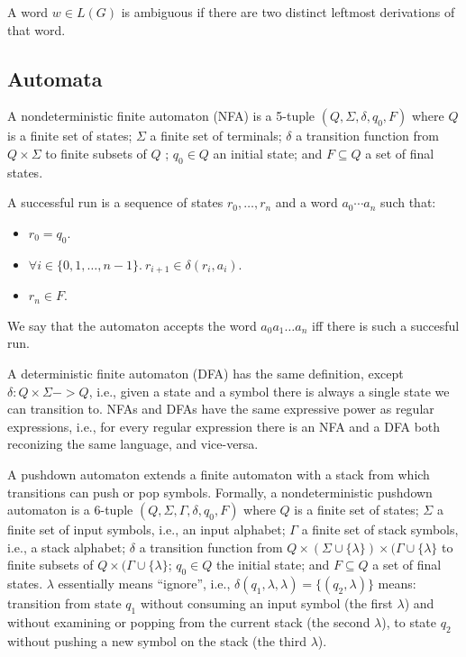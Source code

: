 \documentclass[acmsmall,review,anonymous]{acmart}\settopmatter{printfolios=true,printccs=false,printacmref=false}
\newcommand{\T}{\Sigma} %
\begin{document}
\begin{definition}
A word $w \in L(G)$ is ambiguous if there are two distinct leftmost derivations of that word.
\end{definition}

\subsection{Automata} \label{sec:preliminaries-automata}

A nondeterministic finite automaton (NFA) is a 5-tuple $(Q, \T, \delta, q_0, F)$ where $Q$ is a finite set of states; $\T$ a finite set of terminals; $\delta$ a transition function from $Q \times \T$ to finite subsets of $Q$ ; $q_0 \in Q$ an initial state; and $F \subseteq Q$ a set of final states.

A successful run is a sequence of states $r_0, \ldots, r_n$ and a word $a_0\cdots a_n$ such that:

\begin{itemize}
\item $r_0 = q_0$.
\item $\forall i \in \{0, 1, \ldots, n-1\}.\ r_{i+1} \in \delta(r_i, a_i)$.
\item $r_n \in F$.
\end{itemize}

\noindent We say that the automaton accepts the word $a_0a_1\ldots a_n$ iff there is such a succesful run.

A deterministic finite automaton (DFA) has the same definition, except $\delta : Q \times \Sigma -> Q$, i.e., given a state and a symbol there is always a single state we can transition to. NFAs and DFAs have the same expressive power as regular expressions, i.e., for every regular expression there is an NFA and a DFA both reconizing the same language, and vice-versa. %

A pushdown automaton extends a finite automaton with a stack from which transitions can push or pop symbols. Formally, a nondeterministic pushdown automaton is a 6-tuple $(Q, \T, \Gamma, \delta, q_0, F)$ where $Q$ is a finite set of states; $\T$ a finite set of input symbols, i.e., an input alphabet; $\Gamma$ a finite set of stack symbols, i.e., a stack alphabet; $\delta$ a transition function from $Q \times (\T \cup \{\lambda\}) \times (\Gamma \cup \{\lambda\}$ to finite subsets of $Q \times (\Gamma \cup \{\lambda\}$; $q_0 \in Q$ the initial state; and $F \subseteq Q$ a set of final states. $\lambda$ essentially means ``ignore'', i.e., $\delta(q_1, \lambda, \lambda) = \{(q_2, \lambda)\}$ means: transition from state $q_1$ without consuming an input symbol (the first $\lambda$) and without examining or popping from the current stack (the second $\lambda$), to state $q_2$ without pushing a new symbol on the stack (the third $\lambda$).
\end{document}
